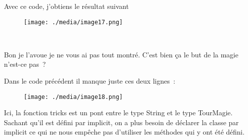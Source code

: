 \documentclass[12pt]{article}
\begin{document}
\vspace{\baselineskip}
Avec ce code, j’obtiens le résultat suivant\par


\vspace{\baselineskip}



\begin{figure}[H]
	\begin{Center}
		\texttt{[image: ./media/image17.png]}
	\end{Center}
\end{figure}



\begin{Center}
\ \ \ \ \ \ \ \ \ \ \ \ \ \ \ \ \ \ \ \ \ \ \ \ \ \ \ \ \ \ \ \ \ \ \ \ \
\end{Center}\par


\vspace{\baselineskip}

\vspace{\baselineskip}
Bon je l’avoue je ne vous ai pas tout montré. C’est bien ça le but de la magie n’est-ce pas ?\par

Dans le code précédent il manque juste ces deux lignes :\par

\par



\begin{figure}[H]
	\begin{Center}
		\texttt{[image: ./media/image18.png]}
	\end{Center}
\end{figure}



\par


\vspace{\baselineskip}
Ici, la fonction tricks est un pont entre le type String et le type TourMagie. Sachant qu’il est défini par implicit, on a plus besoin de déclarer la classe par implicit ce qui ne nous empêche pas d’utiliser les méthodes qui y ont été défini. \par
\end{document}

